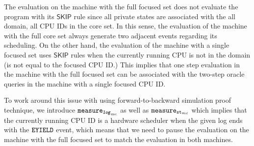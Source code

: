 The evaluation on the machine with the full focused set does not evaluate the program with its $\textsf{SKIP}$ rule since all private states are associated with the all domain, all CPU IDs in the core set. 
In this sense, the evaluation of the machine with the full core set always generate two adjacent events regarding its scheduling. 
On the other hand, the evaluation of the machine with a single focused set uses 
$\textsf{SKIP}$ rules when the currently running CPU is not in the domain (is not equal to the focused CPU ID.)
This implies that one step evaluation in the machine with the full focused set 
can be associated with the two-step oracle queries in the machine with a single focused CPU ID.

To work around this issue with using forward-to-backward simulation proof technique, 
we introduce ${{\mathrm{\texttt{measure}}}_{{{\mathrm{\texttt{\textbf{\textit{log}}}}}_{\mathrm{mc}}}}}$ as well as ${{\mathrm{\texttt{measure}}}_{{\mathrm{\texttt{st}}}_{mc}}}$ which implies that 
the currently running CPU ID is a hardware scheduler when the given log ends with the ${{\mathrm{\texttt{EYIELD}}}}$ event, which means that we need to pause the evaluation on the machine with the full focused set to match the evaluation in both machines.

